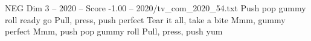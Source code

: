\begin{textsample}{NEG Dim 3 – 2020 – Score -1.00 – 2020/tv\_com\_2020\_54.txt}  \label{ex:f3_neg_033}
Push pop gummy roll ready go Pull, press, push perfect Tear it all, take a bite Mmm, gummy perfect Mmm, push pop gummy roll Pull, press, push yum

\end{textsample}
